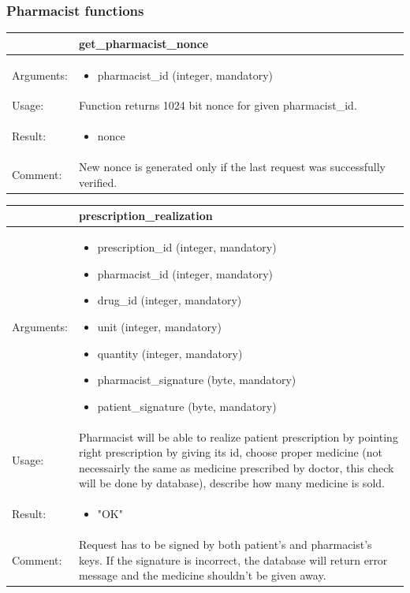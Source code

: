 \subsubsection{Pharmacist functions}


    \begin{longtable}{| p{6cm} | p{7.75cm} |}
    \hline
     & get\_pharmacist\_nonce \\ \hline
    Arguments: &  \begin{itemize}
    	\item pharmacist\_id (integer, mandatory)
	\end{itemize}     \\ \hline
    Usage: & Function returns 1024 bit nonce for given pharmacist\_id. \\ \hline
    Result: & \begin{itemize}
    	\item nonce
	\end{itemize}     \\ \hline	
			Comment: & New nonce is generated only if the last request was successfully verified.\\ \hline
    \end{longtable}


    \begin{longtable}{| p{6cm} | p{7.75cm} |}
    \hline
     & prescription\_realization \\ \hline
    Arguments: &  \begin{itemize}
    	\item prescription\_id (integer, mandatory)
		\item pharmacist\_id (integer, mandatory)
		\item drug\_id (integer, mandatory)
		\item unit (integer, mandatory)
		\item quantity (integer, mandatory)
		\item pharmacist\_signature (byte, mandatory)
		\item patient\_signature (byte, mandatory)

	\end{itemize}     \\ \hline
    Usage: & Pharmacist will be able to realize patient prescription by pointing right prescription by giving its id, choose proper medicine (not necessairly the same as medicine prescribed by doctor, this check will be done by database), describe how many medicine is sold.\\ \hline
    Result: & \begin{itemize}
    	\item "OK"
	\end{itemize}     \\ \hline	
	Comment: & Request has to be signed by both patient's and pharmacist's keys. If the signature is incorrect, the database will return error message and the medicine shouldn't be given away.\\ \hline
    \end{longtable}


